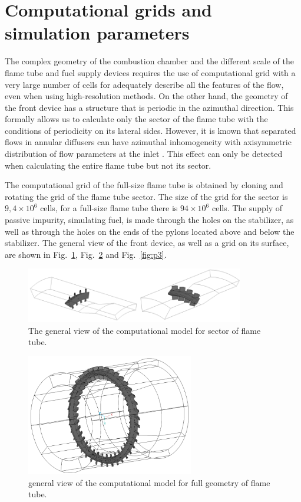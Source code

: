 \documentclass[
11pt,%
tightenlines,%
twoside,%
onecolumn,%
nofloats,%
nobibnotes,%
nofootinbib,%
superscriptaddress,%
noshowpacs,%
centertags]%
{revtex4}
\begin{document}
\section{Computational grids and simulation parameters}

The complex geometry of the combustion chamber and the different scale of the flame tube and fuel supply devices requires the use of computational grid with a very large number of cells for adequately describe all the features of the flow, even when using high-resolution methods.
On the other hand, the geometry of the front device has a structure that is periodic in the azimuthal direction.
This formally allows us to calculate only the sector of the flame tube with the conditions of periodicity on its lateral sides.
However, it is known that separated flows in annular diffusers can have azimuthal inhomogeneity with axisymmetric distribution of flow parameters at the inlet \cite{Lyub_Diffusers}.
This effect can only be detected when calculating the entire flame tube but not its sector.

The computational grid of the full-size flame tube is obtained by cloning and rotating the grid of the flame tube sector.
The size of the grid for the sector is $9,4 \times 10^6$ cells, for a full-size flame tube there is $94 \times 10^6$ cells.
The supply of passive impurity, simulating fuel, is made through the holes on the stabilizer, as well as through the holes on the ends of the pylons located above and below the stabilizer.
The general view of the front device, as well as a grid on its surface, are shown in Fig.~\ref{fig:p1}, Fig.~\ref{fig:p2} and Fig.~\ref{fig:p3}.

\begin{figure}[h]
\setcaptionmargin{5mm}
\onelinecaptionstrue
\includegraphics[width=0.85\textwidth]{pics/p1.png}
\caption{The general view of the computational model for sector of flame tube.}
\label{fig:p1}
\end{figure}

\begin{figure}[h]
\setcaptionmargin{5mm}
\onelinecaptionstrue
\includegraphics[width=0.65\textwidth]{pics/p2.png}
\caption{general view of the computational model for full geometry of flame tube.}
\label{fig:p2}
\end{figure}
\end{document}
